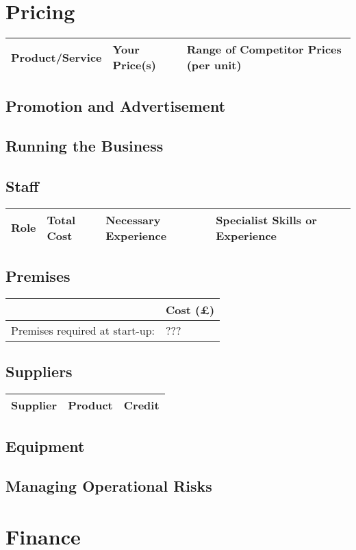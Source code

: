 \documentclass[DIV=calc, paper=a4, fontsize=11pt]{scrartcl}	 %
\begin{document}
\section{Pricing}

\begin{tabular}{|l|l|l|} \hline
Product/Service & Your Price(s) & Range of Competitor Prices (per unit) \\ \hline
\end{tabular}

\subsection{Promotion and Advertisement}

\subsection{Running the Business}

\subsection{Staff}
\begin{tabular}{|l|l|l|l|}\hline
Role & Total Cost & Necessary Experience & Specialist Skills or Experience \\ \hline
\end{tabular}

\subsection{Premises}
\begin{tabular}{|l|l|} \hline
                               & Cost (\pounds) \\ \hline
Premises required at start-up: & ???            \\ \hline
\end{tabular}

\subsection{Suppliers}
\begin{tabular}{|l|l|l|} \hline
Supplier & Product & Credit \\ \hline
\end{tabular}

\subsection{Equipment}

\subsection{Managing Operational Risks}

\section{Finance}
\end{document}
